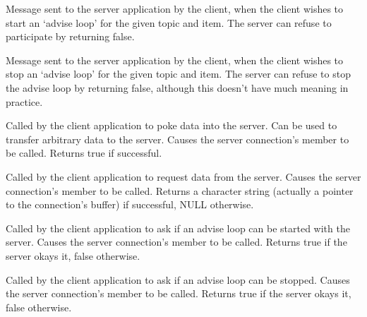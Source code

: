 Message sent to the server application by the client, when the client
wishes to start an `advise loop' for the given topic and item. The
server can refuse to participate by returning false.

\label{wxddeconnectiononstopadvise}


Message sent to the server application by the client, when the client
wishes to stop an `advise loop' for the given topic and item. The
server can refuse to stop the advise loop by returning false, although
this doesn't have much meaning in practice.

\label{wxddeconnectionpoke}


Called by the client application to poke data into the server. Can be
used to transfer arbitrary data to the server. Causes the server
connection's  member
to be called. Returns true if successful.

\label{wxddeconnectionrequest}


Called by the client application to request data from the server. Causes
the server connection's  member to be called. Returns a
character string (actually a pointer to the connection's buffer) if
successful, NULL otherwise.

\label{wxddeconnectionstartadvise}


Called by the client application to ask if an advise loop can be started
with the server. Causes the server connection's \rtfsp
member to be called. Returns true if the server okays it, false
otherwise.

\label{wxddeconnectionstopadvise}


Called by the client application to ask if an advise loop can be
stopped. Causes the server connection's  member
to be called. Returns true if the server okays it, false otherwise.

